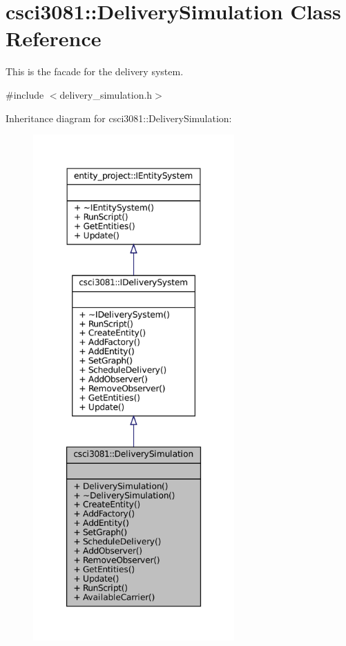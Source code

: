 \hypertarget{classcsci3081_1_1DeliverySimulation}{}\section{csci3081\+:\+:Delivery\+Simulation Class Reference}
\label{classcsci3081_1_1DeliverySimulation}


This is the facade for the delivery system.  




{\ttfamily \#include $<$delivery\+\_\+simulation.\+h$>$}



Inheritance diagram for csci3081\+:\+:Delivery\+Simulation\+:
\nopagebreak
\begin{figure}[H]
\begin{center}
\leavevmode
\includegraphics[height=550pt]{classcsci3081_1_1DeliverySimulation__inherit__graph}
\end{center}
\end{figure}
